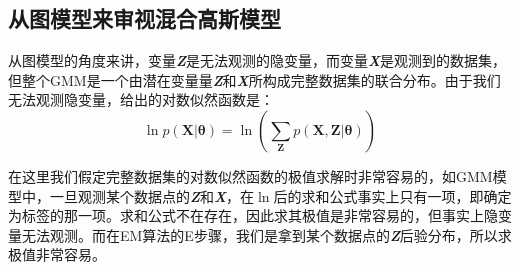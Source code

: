 \documentclass{article}
\begin{document}
\begin{CJK*}{UTF8}{gbsn}
\section{从图模型来审视混合高斯模型}
从图模型的角度来讲，变量\textit{\textbf{Z}}是无法观测的隐变量，而变量\textit{\textbf{X}}是观测到的数据集，但整个GMM是一个由潜在变量量\textit{\textbf{Z}}和\textit{\textbf{X}}所构成完整数据集的联合分布。由于我们无法观测隐变量，给出的对数似然函数是：
\begin{equation} 
    \ln p(\boldsymbol{X}|\boldsymbol{\theta}) = \ln(\sum_{\boldsymbol{Z}}^{}p(\boldsymbol{X}, \boldsymbol{Z}|\boldsymbol{\theta}))
\end{equation}
\par
在这里我们假定完整数据集的对数似然函数的极值求解时非常容易的，如GMM模型中，一旦观测某个数据点的\textit{\textbf{Z}}和\textit{\textbf{X}}，在$\ln$后的求和公式事实上只有一项，即确定为标签的那一项。求和公式不在存在，因此求其极值是非常容易的，但事实上隐变量无法观测。而在EM算法的E步骤，我们是拿到某个数据点的\textit{\textbf{Z}}后验分布，所以求极值非常容易。

\end{CJK*}
\end{document}
